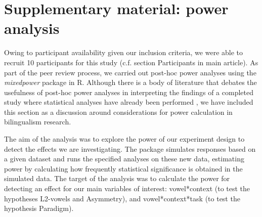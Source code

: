 \documentclass[12 pt]{article}
\begin{document}
\section*{Supplementary material: power analysis}

Owing to participant availability given our inclusion criteria, we were able to recruit 10 participants for this study (c.f. section Participants in main article). As part of the peer review process, we carried out post-hoc power analyses using the \textit{mixedpower} package \citep{kumle2021estimating} in R. Although there is a body of literature that debates the usefulness of post-hoc power analyses in interpreting the findings of a completed study where statistical analyses have already been performed \citep{lakens_2021,dziak2020interpretation,lenth2007post,gelman2019observed_effect_size}, we have included this section as a discussion around considerations for power calculation in bilingualism research. 

The aim of the analysis was to explore the power of our experiment design to detect the effects we are investigating. The package simulates responses based on a given dataset and runs the specified analyses on these new data, estimating power by calculating how frequently statistical significance is obtained in the simulated data. The target of the analysis was to calculate the power for detecting an effect for our main variables of interest: vowel*context (to test the hypotheses L2-vowels and Asymmetry), and vowel*context*task (to test the hypothesis Paradigm). 
\end{document}
